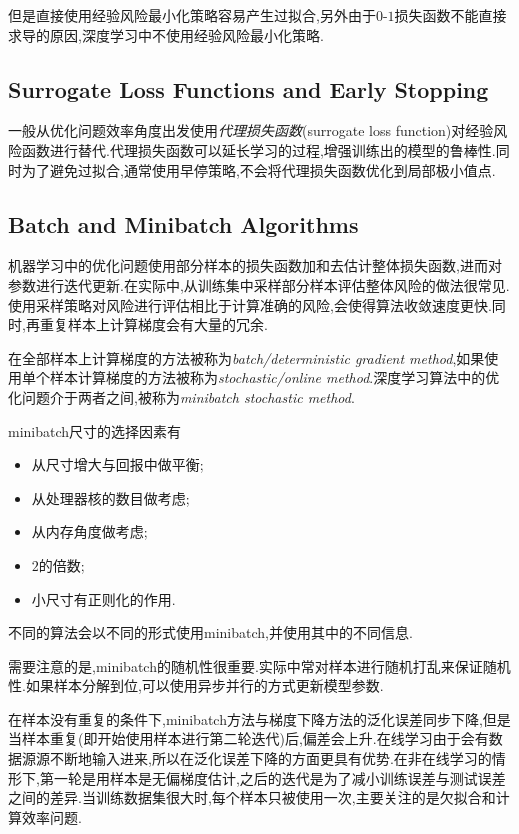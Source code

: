 但是直接使用经验风险最小化策略容易产生过拟合,另外由于$0$-$1$损失函数不能直接求导的原因,深度学习中不使用经验风险最小化策略.

\subsection{Surrogate Loss Functions and Early Stopping}

一般从优化问题效率角度出发使用\textit{代理损失函数}(surrogate loss function)对经验风险函数进行替代.代理损失函数可以延长学习的过程,增强训练出的模型的鲁棒性.同时为了避免过拟合,通常使用早停策略,不会将代理损失函数优化到局部极小值点.

\subsection{Batch and Minibatch Algorithms}

机器学习中的优化问题使用部分样本的损失函数加和去估计整体损失函数,进而对参数进行迭代更新.在实际中,从训练集中采样部分样本评估整体风险的做法很常见.使用采样策略对风险进行评估相比于计算准确的风险,会使得算法收敛速度更快.同时,再重复样本上计算梯度会有大量的冗余.

在全部样本上计算梯度的方法被称为\textit{batch/deterministic gradient method},如果使用单个样本计算梯度的方法被称为\textit{stochastic/online method}.深度学习算法中的优化问题介于两者之间,被称为\textit{minibatch stochastic method}.

minibatch尺寸的选择因素有
\begin{itemize}
    \item 从尺寸增大与回报中做平衡;
    \item 从处理器核的数目做考虑;
    \item 从内存角度做考虑;
    \item $2$的倍数;
    \item 小尺寸有正则化的作用.
\end{itemize}

不同的算法会以不同的形式使用minibatch,并使用其中的不同信息.

需要注意的是,minibatch的随机性很重要.实际中常对样本进行随机打乱来保证随机性.如果样本分解到位,可以使用异步并行的方式更新模型参数.

在样本没有重复的条件下,minibatch方法与梯度下降方法的泛化误差同步下降,但是当样本重复(即开始使用样本进行第二轮迭代)后,偏差会上升.在线学习由于会有数据源源不断地输入进来,所以在泛化误差下降的方面更具有优势.在非在线学习的情形下,第一轮是用样本是无偏梯度估计,之后的迭代是为了减小训练误差与测试误差之间的差异.当训练数据集很大时,每个样本只被使用一次,主要关注的是欠拟合和计算效率问题.

